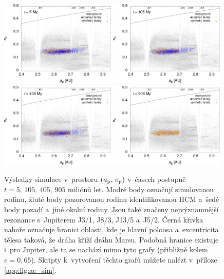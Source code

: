 \documentclass[A4paper, 12pt, oneside, openany]{book}
\begin{document}
\immediate{}
\immediate{}
\immediate{}
\immediate{}
\begin{figure}[t]
	\centering
	\includegraphics[width=0.49\textwidth]{obr/ae_5t.png}
	\includegraphics[width=0.49\textwidth]{obr/ae_105t.png}\\
	\includegraphics[width=0.49\textwidth]{obr/ae_405t.png}
	\includegraphics[width=0.49\textwidth]{obr/ae_905t.png}
	\caption{Výsledky simulace v~prostoru $(a_{\rm p},\,e_{\rm p})$ v~časech postupně $t=5,\,105,\,405,\,905$ miliónů let. Modré body označují simulovanou rodinu, žluté body pozorovanou rodinu identifikovanou HCM a~šedé body pozadí a~jiné okolní rodiny. Jsou také značeny nejvýznamnější rezonance s~Jupiterem J3/1, J8/3, J13/5 a~J5/2. Černá křivka nahoře označuje hranici oblasti, kde je hlavní poloosa a~excentricita tělesa taková, že dráha kříží dráhu Marsu. Podobná hranice existuje i~pro Jupiter, ale ta se nachází mimo tyto grafy (přibližně kolem $e=0,65$). Skripty k~vytvoření těchto grafů můžete nalézt v~příloze \ref{app:fig:ae_sim}.} \label{fig:ae_sim}
\end{figure}	
\end{document}
